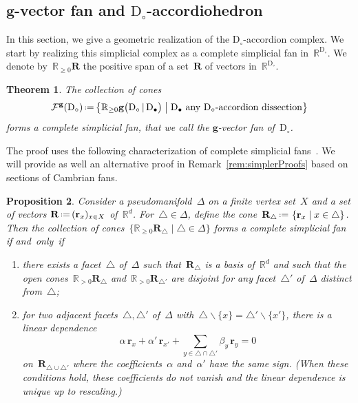 \documentclass{amsart}
\newtheorem{theorem}{Theorem}%
\newtheorem{proposition}[theorem]{Proposition}
\theoremstyle{definition}
\newcommand{\R}{\mathbb{R}} %
\renewcommand{\b}[1]{\mathbf{#1}} %
\newcommand{\set}[2]{\left\{ #1 \;\middle|\; #2 \right\}} %
\newcommand{\bigset}[2]{\big\{ #1 \;\big|\; #2 \big\}} %
\newcommand{\ssm}{\smallsetminus} %
\newcommand{\eqdef}{\mbox{\,\raisebox{0.2ex}{\scriptsize\ensuremath{\mathrm:}}\ensuremath{=}\,}} %
\newcommand{\darkblue}{\color{darkblue}} %
\newcommand{\defn}[1]{\textsl{\darkblue #1}} %
\newcommand{\dissection}{\mathrm{D}} %
\newcommand{\biggvectors}[2]{\mathbf{g} \big( #1 \,|\, #2 \big)} %
\newcommand{\gvectorFan}{\mathcal{F}^\mathbf{g}} %
\newcommand{\ray}{\mathbf{r}} %
\newcommand{\rays}{\mathbf{R}} %
\begin{document}

\subsection{$\b{g}$-vector fan and $\dissection_\circ$-accordiohedron}
\label{subsec:gvectorFan}

\enlargethispage{.1cm}
In this section, we give a geometric realization of the $\dissection_\circ$-accordion complex. We start by realizing this simplicial complex as a complete simplicial fan in~$\R^{\dissection_\circ}$. We denote by~$\R_{\ge0} \b{R}$ the positive span of a set~$\b{R}$ of vectors in~$\R^{\dissection_\circ}$.

\begin{theorem}
\label{thm:gvectorFan}
The collection of cones
\[
\gvectorFan(\dissection_\circ) \eqdef \bigset{\R_{\ge0} \biggvectors{\dissection_\circ}{\dissection_\bullet}}{\dissection_\bullet \text{ any $\dissection_\circ$-accordion dissection}}
\]
forms a complete simplicial fan, that we call the \defn{$\b{g}$-vector fan} of~$\dissection_\circ$.
\end{theorem}

The proof uses the following characterization of complete simplicial fans~\cite[Corollary~4.5.20]{DeLoeraRambauSantos}. We will provide as well an alternative proof in Remark~\ref{rem:simplerProofs} based on sections of Cambrian fans.

\begin{proposition}
\label{prop:characterizationFan}
Consider a pseudomanifold~$\Delta$ on a finite vertex set~$X$ and a set of vectors $\rays \eqdef (\ray_x)_{x \in X}$ of~$\R^d$. For~$\triangle \in \Delta$, define the cone~$\rays_\triangle \eqdef \set{\ray_x}{x \in \triangle}$. Then the collection of cones~$\bigset{\R_{\ge 0}\rays_\triangle}{\triangle \in \Delta}$ forms a complete simplicial fan if and~only~if
\begin{enumerate}
\item there exists a facet~$\triangle$ of~$\Delta$ such that~$\rays_\triangle$ is a basis of~$\R^d$ and such that the open cones~$\R_{> 0}\rays_\triangle$ and~$\R_{> 0}\b{R}_{\triangle'}$ are disjoint for any facet~$\triangle'$ of~$\Delta$ distinct from~$\triangle$;
\item for two adjacent facets~$\triangle, \triangle'$ of~$\Delta$ with~$\triangle \ssm \{x\} = \triangle' \ssm \{x'\}$, there is a linear dependence
\[
\alpha \, \ray_x + \alpha' \, \ray_{x'} + \sum_{y \in \triangle \cap \triangle'} \beta_y \, \ray_y = 0
\]
on~$\b{R}_{\triangle \cup \triangle'}$ where the coefficients~$\alpha$ and~$\alpha'$ have the same sign. (When these conditions hold, these coefficients do not vanish and the linear dependence is unique up to rescaling.)
\end{enumerate}
\end{proposition}
\end{document}
